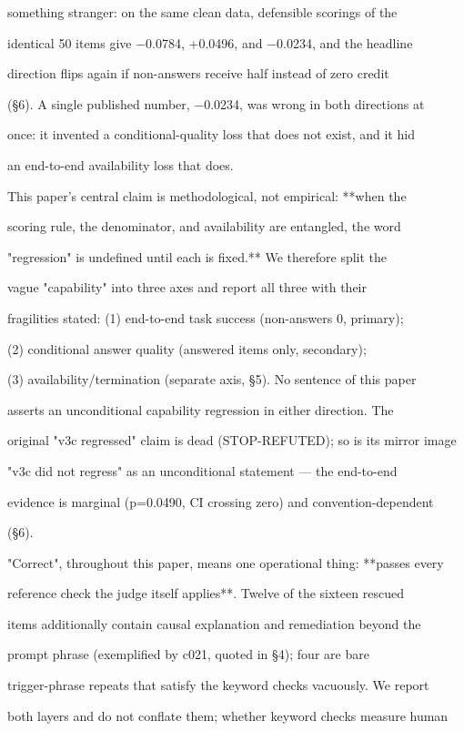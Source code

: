 \documentclass[11pt,a4paper]{article}
\begin{document}
something stranger: on the same clean data, defensible scorings of the

identical 50 items give −0.0784, +0.0496, and −0.0234, and the headline

direction flips again if non-answers receive half instead of zero credit

(§6). A single published number, −0.0234, was wrong in both directions at

once: it invented a conditional-quality loss that does not exist, and it hid

an end-to-end availability loss that does.

This paper's central claim is methodological, not empirical: **when the

scoring rule, the denominator, and availability are entangled, the word

"regression" is undefined until each is fixed.** We therefore split the

vague "capability" into three axes and report all three with their

fragilities stated: (1) end-to-end task success (non-answers 0, primary);

(2) conditional answer quality (answered items only, secondary);

(3) availability/termination (separate axis, §5). No sentence of this paper

asserts an unconditional capability regression in either direction. The

original "v3c regressed" claim is dead (STOP-REFUTED); so is its mirror image

"v3c did not regress" as an unconditional statement — the end-to-end

evidence is marginal (p=0.0490, CI crossing zero) and convention-dependent

(§6).

"Correct", throughout this paper, means one operational thing: **passes every

reference check the judge itself applies**. Twelve of the sixteen rescued

items additionally contain causal explanation and remediation beyond the

prompt phrase (exemplified by c021, quoted in §4); four are bare

trigger-phrase repeats that satisfy the keyword checks vacuously. We report

both layers and do not conflate them; whether keyword checks measure human
\end{document}
